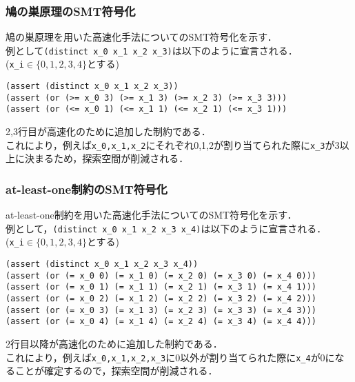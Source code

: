 \begin{frame}[fragile]\small
    \frametitle{鳩の巣原理のSMT符号化}
    鳩の巣原理を用いた高速化手法についてのSMT符号化を示す．\\
    例として\verb|(distinct x_0 x_1 x_2 x_3)|は以下のように宣言される．\\
    (\verb|x_i|$\in \{0,1,2,3,4\}$とする)
    \begin{exampleblock}{}\scriptsize
\begin{verbatim}
(assert (distinct x_0 x_1 x_2 x_3))
(assert (or (>= x_0 3) (>= x_1 3) (>= x_2 3) (>= x_3 3)))
(assert (or (<= x_0 1) (<= x_1 1) (<= x_2 1) (<= x_3 1)))
\end{verbatim}
    \end{exampleblock}
    2,3行目が高速化のために追加した制約である．\\
    これにより，例えば\verb|x_0,x_1,x_2|にそれぞれ0,1,2が割り当てられた際に\verb|x_3|が3以上に決まるため，探索空間が削減される．
\end{frame}


\begin{frame}[fragile]\small
    \frametitle{at-least-one制約のSMT符号化}
    at-least-one制約を用いた高速化手法についてのSMT符号化を示す．\\
    例として，\verb|(distinct x_0 x_1 x_2 x_3 x_4)|は以下のように宣言される．\\
    (\verb|x_i|$\in \{0,1,2,3,4\}$とする)
    \begin{exampleblock}{}\scriptsize
\begin{verbatim}
(assert (distinct x_0 x_1 x_2 x_3 x_4))
(assert (or (= x_0 0) (= x_1 0) (= x_2 0) (= x_3 0) (= x_4 0)))
(assert (or (= x_0 1) (= x_1 1) (= x_2 1) (= x_3 1) (= x_4 1)))
(assert (or (= x_0 2) (= x_1 2) (= x_2 2) (= x_3 2) (= x_4 2)))
(assert (or (= x_0 3) (= x_1 3) (= x_2 3) (= x_3 3) (= x_4 3)))
(assert (or (= x_0 4) (= x_1 4) (= x_2 4) (= x_3 4) (= x_4 4)))
\end{verbatim}
    \end{exampleblock}
    2行目以降が高速化のために追加した制約である．\\
    これにより，例えば\verb|x_0,x_1,x_2,x_3|に0以外が割り当てられた際に\verb|x_4|が0になることが確定するので，探索空間が削減される．
\end{frame}

